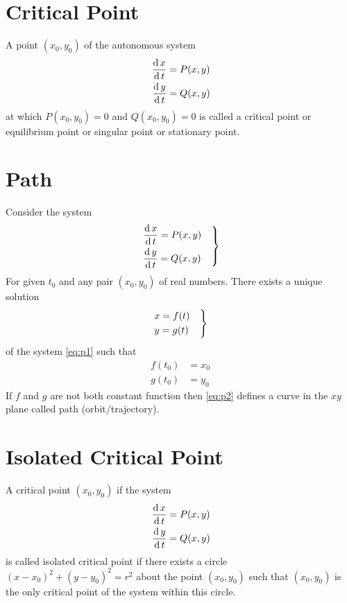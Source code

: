 \documentclass[../main-sheet.tex]{subfiles}
\begin{document}
\section{Critical Point}
A point \((x_0,y_0)\) of the autonomous system  
\begin{align*}
    \,\frac{\mathrm{d}\,x}{\mathrm{d}\,t}&=P(x,y)\\
    \,\frac{\mathrm{d}\,y}{\mathrm{d}\,t}&=Q(x,y)
\end{align*}
at which \(P(x_0,y_0)=0\) and \(Q(x_0,y_0)=0\) is called a critical point or equilibrium point or singular point or stationary point.
\section{Path}
Consider the system
\begin{equation}
    \begin{rcases}
        \displaystyle\,\frac{\mathrm{d}\,x}{\mathrm{d}\,t}=P(x,y)\quad\\
        \displaystyle\,\frac{\mathrm{d}\,y}{\mathrm{d}\,t}=Q(x,y)    
    \end{rcases}
    \label{eq:p1}
\end{equation}
For given \(t_0\) and any pair \((x_0,y_0)\) of real numbers. There exists a unique solution  
\begin{equation}
    \begin{rcases}
        x=f(t)\quad\\
        {y}=g(t)
    \end{rcases}
    \label{eq:p2}
\end{equation}
of the system \eqref{eq:p1} such that
\begin{align*}
    f(t_0)&=x_0\\
    g(t_0)&=y_0
\end{align*}
If \(f\) and \(g\) are not both constant function then \eqref{eq:p2} defines a curve in the \(xy\) plane called path (orbit/trajectory).
\section{Isolated Critical Point}
A critical point \((x_0,y_0)\) if the system
\begin{align*}
    \,\frac{\mathrm{d}\,x}{\mathrm{d}\,t}&=P(x,y)\\
    \,\frac{\mathrm{d}\,y}{\mathrm{d}\,t}&=Q(x,y)
\end{align*}
is called isolated critical point if there exists a circle \((x-x_0)^2+(y-y_0)^2=r^2\) about the point \((x_0,y_0)\) such that \((x_0,y_0)\) is the only critical point of the system within this circle.
\end{document}
